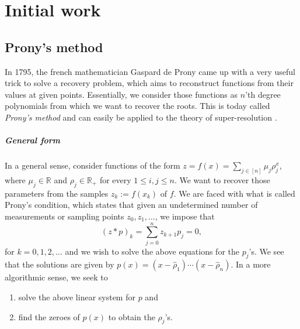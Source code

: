 \chapter{Initial work}
\section{Prony's method}
In 1795, the french mathematician Gaspard de Prony came up with a very useful trick to solve a recovery problem, which aims to reconstruct functions from their values at given points. Essentially, we consider those functions as  $n$'th degree polynomials from which we want to recover the roots. This is today called \textit{Prony's method} and can easily be applied to the theory of super-resolution \cite{pronyMethod}.
\paragraph{General form} In a general sense, consider functions of the form $z=f(x)=\sum_{j\in[n]}\mu_j\rho_j^x$, where $\mu_j\in\mathbb{R}$ and $\rho_j\in\mathbb{R}_+$ for every $1\leq i,j\leq n$. We want to recover those parameters from the samples $z_k:=f(x_k)$ of $f$. We are faced with what is called Prony's condition, which states that given an undetermined number of measurements or sampling points $z_0,z_1,\ldots$, we impose that $$(z*p)_k=\sum_{j=0}^n z_{k+1}p_j=0,$$ for $k=0,1,2,\ldots$ and we wish to solve the above equations for the $p_j$'s. We see that the solutions are given by $p(x)=(x-\widehat{\rho}_1)\cdots(x-\widehat{\rho}_n)$. In a more algorithmic sense, we seek to 
\begin{enumerate}
    \item solve the above linear system for $p$ and 
    \item find the zeroes of $p(x)$ to obtain the $\rho_j$'s.
\end{enumerate}
